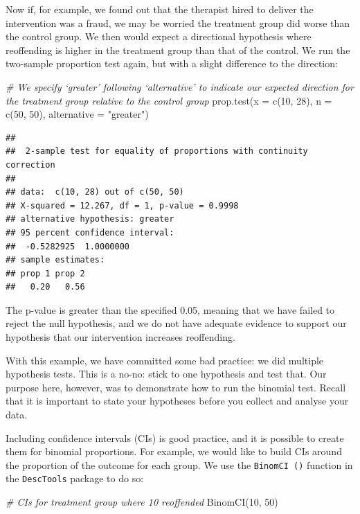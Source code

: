 \documentclass[
]{book}
\newenvironment{Shaded}{\begin{snugshade}}{\end{snugshade}}
\newcommand{\AttributeTok}[1]{\textcolor[rgb]{0.77,0.63,0.00}{#1}}
\newcommand{\CommentTok}[1]{\textcolor[rgb]{0.56,0.35,0.01}{\textit{#1}}}
\newcommand{\DecValTok}[1]{\textcolor[rgb]{0.00,0.00,0.81}{#1}}
\newcommand{\FunctionTok}[1]{\textcolor[rgb]{0.00,0.00,0.00}{#1}}
\newcommand{\NormalTok}[1]{#1}
\newcommand{\StringTok}[1]{\textcolor[rgb]{0.31,0.60,0.02}{#1}}
\begin{document}
Now if, for example, we found out that the therapist hired to deliver the intervention was a fraud, we may be worried the treatment group did worse than the control group. We then would expect a directional hypothesis where reoffending is higher in the treatment group than that of the control. We run the two-sample proportion test again, but with a slight difference to the direction:

\begin{Shaded}
\begin{Highlighting}[]
\CommentTok{\# We specify ‘greater’ following ‘alternative’ to indicate our expected direction for the treatment group relative to the control group}
\FunctionTok{prop.test}\NormalTok{(}\AttributeTok{x =} \FunctionTok{c}\NormalTok{(}\DecValTok{10}\NormalTok{, }\DecValTok{28}\NormalTok{), }\AttributeTok{n =} \FunctionTok{c}\NormalTok{(}\DecValTok{50}\NormalTok{, }\DecValTok{50}\NormalTok{), }\AttributeTok{alternative =} \StringTok{"greater"}\NormalTok{)}
\end{Highlighting}
\end{Shaded}

\begin{verbatim}
## 
##  2-sample test for equality of proportions with continuity correction
## 
## data:  c(10, 28) out of c(50, 50)
## X-squared = 12.267, df = 1, p-value = 0.9998
## alternative hypothesis: greater
## 95 percent confidence interval:
##  -0.5282925  1.0000000
## sample estimates:
## prop 1 prop 2 
##   0.20   0.56
\end{verbatim}

The p-value is greater than the specified 0.05, meaning that we have failed to reject the null hypothesis, and we do not have adequate evidence to support our hypothesis that our intervention increases reoffending.

With this example, we have committed some bad practice: we did multiple hypothesis tests. This is a no-no: stick to one hypothesis and test that. Our purpose here, however, was to demonstrate how to run the binomial test. Recall that it is important to state your hypotheses before you collect and analyse your data.

Including confidence intervals (CIs) is good practice, and it is possible to create them for binomial proportions. For example, we would like to build CIs around the proportion of the outcome for each group. We use the \texttt{BinomCI\ ()} function in the \texttt{DescTools} package to do so:

\begin{Shaded}
\begin{Highlighting}[]
\CommentTok{\# CIs for treatment group where 10 reoffended}
\FunctionTok{BinomCI}\NormalTok{(}\DecValTok{10}\NormalTok{, }\DecValTok{50}\NormalTok{)}
\end{Highlighting}
\end{Shaded}
\end{document}

